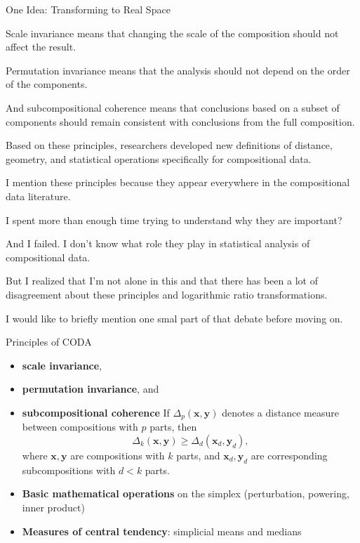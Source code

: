 \begin{frame}{One Idea: Transforming to Real Space}
{{Scale invariance means that changing the scale of the composition should not affect the result.

Permutation invariance means that the analysis should not depend on the order of the components.

And subcompositional coherence means that conclusions based on a subset of components should remain consistent with conclusions from the full composition.

Based on these principles, researchers developed new definitions of distance, geometry, and statistical operations specifically for compositional data.


I mention these principles because they appear everywhere in the compositional data literature.



I spent more than enough time trying to understand why they are important?

And I failed. I don't know what role they play in statistical analysis of compositional data.

But I realized that I'm not alone in this and that there has been a lot of disagreement about these principles and logarithmic ratio transformations.

I would like to briefly mention one smal part of that debate before moving on.



}

   \begin{alertblock}{Principles of CODA}
      \begin{itemize}
       \item 
   \textbf{scale invariance},
   \item
   \textbf{permutation invariance}, and 
   \item \textbf{subcompositional coherence}
   If \( \Delta_p(\mathbf{x}, \mathbf{y}) \) denotes a distance measure between compositions with \( p \) parts, then
    \begin{equation*}
    \Delta_k(\mathbf{x}, \mathbf{y}) \geq \Delta_d(\mathbf{x}_d, \mathbf{y}_d),
    \end{equation*}
    where \( \mathbf{x}, \mathbf{y} \) are compositions with \( k \) parts, and \( \mathbf{x}_d, \mathbf{y}_d \) are corresponding subcompositions with \( d < k \) parts.
    \end{itemize}
    \end{alertblock}

    
      \begin{itemize}
        \item[1)] \textbf{Basic mathematical operations} on the simplex (perturbation, powering, inner product)
        \item[2)] \textbf{Measures of central tendency}: simplicial means and medians


\end{itemize}}
\end{frame}
